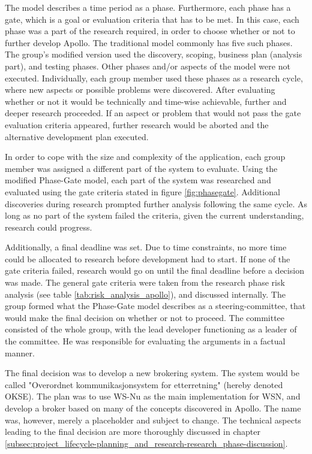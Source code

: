 The model describes a time period as a phase. Furthermore, each phase has a gate, which is a goal or evaluation criteria that has to be met. In this case, each phase was a part of the research required, in order to choose whether or not to further develop Apollo. The traditional model commonly has five such phases. The group's modified version used the discovery, scoping, business plan (analysis part), and testing phases. Other phases and/or aspects of the model were not executed. Individually, each group member used these phases as a research cycle, where new aspects or possible problems were discovered. After evaluating whether or not it would be technically and time-wise achievable, further and deeper research proceeded. If an aspect or problem that would not pass the gate evaluation criteria appeared, further research would be aborted and the alternative development plan executed.

In order to cope with the size and complexity of the application, each group member was assigned a different part of the system to evaluate. Using the modified Phase-Gate model, each part of the system was researched and evaluated using the gate criteria stated in figure \ref{fig:phasegate}. Additional discoveries during research prompted further analysis following the same cycle. As long as no part of the system failed the criteria, given the current understanding, research could progress.

Additionally, a final deadline was set. Due to time constraints, no more time could be allocated to research before development had to start. If none of the gate criteria failed, research would go on until the final deadline before a decision was made. The general gate criteria were taken from the research phase risk analysis (see table \ref{tab:risk_analysis_apollo}), and discussed internally. The group formed what the Phase-Gate model describes as a steering-committee, that would make the final decision on whether or not to proceed. The committee consisted of the whole group, with the lead developer functioning as a leader of the committee. He was responsible for evaluating the arguments in a factual manner. 

The final decision was to develop a new brokering system. The system would be called "Overordnet kommunikasjonsystem for etterretning" (hereby denoted OKSE). The plan was to use WS-Nu as the main implementation for WSN, and develop a broker based on many of the concepts discovered in Apollo. The name was, however, merely a placeholder and subject to change. The technical aspects leading to the final decision are more thoroughly discussed in chapter \ref{subsec:project_lifecycle-planning_and_research-research_phase-discussion}.

